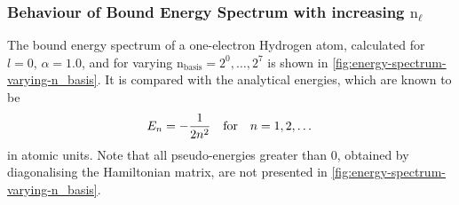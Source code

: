 \documentclass[]{article}
\begin{document}
\subsubsection{Behaviour of Bound Energy Spectrum with increasing
  $\mathrm{n_{\ell}}$}


The bound energy spectrum of a one-electron Hydrogen atom, calculated for
$l = 0$, $\alpha = 1.0$, and for varying
$\mathrm{n_{basis}} = 2^{0}, \dotsc,  2^{7}$ is shown in
\autoref{fig:energy-spectrum-varying-n_basis}.
It is compared with the analytical energies, which are known to be
\begin{equation*}
  E_{n}
  =
  -
  \dfrac{1}{2 n^{2}}
  \qq{for}
  n = 1, 2, \dotsc
\end{equation*}
in atomic units.
Note that all pseudo-energies greater than 0, obtained by diagonalising the
Hamiltonian matrix, are not presented in
\autoref{fig:energy-spectrum-varying-n_basis}.
\end{document}
